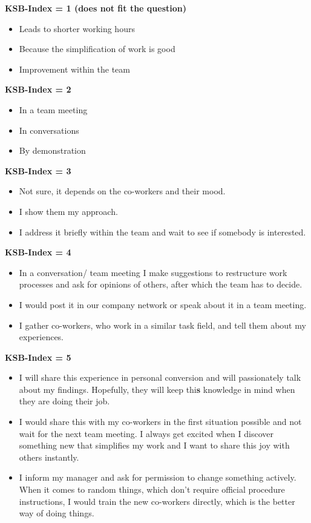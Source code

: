 \documentclass[twocolumn, issue, empirical, authordate]{jote-new-article}
\begin{document}
\textbf{KSB-Index = 1 (does not fit the question)}

\begin{itemize} \item Leads to shorter working hours \item Because the simplification of work is good \item Improvement within the team \end{itemize} 


\textbf{KSB-Index = 2}

\begin{itemize} \item In a team meeting \item In conversations \item By demonstration \end{itemize} 


\textbf{KSB-Index = 3}

\begin{itemize} \item Not sure, it depends on the co-workers and their mood.
\item I show them my approach.
\item I address it briefly within the team and wait to see if somebody is interested.
\end{itemize} 


\textbf{KSB-Index = 4}

\begin{itemize} \item In a conversation/ team meeting I make suggestions to restructure work processes and ask for opinions of others, after which the team has to decide.
\item I would post it in our company network or speak about it in a team meeting.
\item I gather co-workers, who work in a similar task field, and tell them about my experiences.
\end{itemize} 


\textbf{KSB-Index = 5}

\begin{itemize} \item I will share this experience in personal conversion and will passionately talk about my findings. Hopefully, they will keep thi\textbf{s} knowledge in mind when they are doing their job.
\item I would share this with my co-workers in the first situation possible and not wait for the next team meeting. I always get excited when I discover something new that simplifies my work and I want to share this joy with others instantly.
\item I inform my manager and ask for permission to change something actively. When it comes to random things, which don't require official procedure instructions, I would train the new co-workers directly, which is the better way of doing things.
\end{itemize} 
\end{document}
